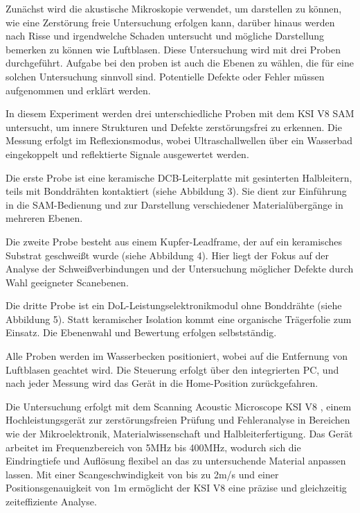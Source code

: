 Zunächst wird die akustische Mikroskopie verwendet, um darstellen zu können, wie eine Zerstörung freie Untersuchung erfolgen kann, darüber hinaus werden nach Risse und irgendwelche Schaden untersucht und mögliche Darstellung bemerken zu können wie Luftblasen. Diese Untersuchung wird mit drei Proben durchgeführt.
Aufgabe bei den proben ist auch die Ebenen zu wählen, die für eine solchen Untersuchung sinnvoll sind.  Potentielle
Defekte oder Fehler müssen aufgenommen und erklärt werden.


In diesem Experiment werden drei unterschiedliche Proben mit dem KSI V8 SAM untersucht, um innere Strukturen und Defekte zerstörungsfrei zu erkennen. Die Messung erfolgt im Reflexionsmodus, wobei Ultraschallwellen über ein Wasserbad eingekoppelt und reflektierte Signale ausgewertet werden.

Die erste Probe ist eine keramische DCB-Leiterplatte mit gesinterten Halbleitern, teils mit Bonddrähten kontaktiert (siehe Abbildung 3). Sie dient zur Einführung in die SAM-Bedienung und zur Darstellung verschiedener Materialübergänge in mehreren Ebenen.

Die zweite Probe besteht aus einem Kupfer-Leadframe, der auf ein keramisches Substrat geschweißt wurde (siehe Abbildung 4). Hier liegt der Fokus auf der Analyse der Schweißverbindungen und der Untersuchung möglicher Defekte durch Wahl geeigneter Scanebenen.

Die dritte Probe ist ein DoL-Leistungselektronikmodul ohne Bonddrähte (siehe Abbildung 5). Statt keramischer Isolation kommt eine organische Trägerfolie zum Einsatz. Die Ebenenwahl und Bewertung erfolgen selbstständig.

Alle Proben werden im Wasserbecken positioniert, wobei auf die Entfernung von Luftblasen geachtet wird. Die Steuerung erfolgt über den integrierten PC, und nach jeder Messung wird das Gerät in die Home-Position zurückgefahren.



Die Untersuchung erfolgt mit dem Scanning Acoustic Microscope KSI V8 \cite{2}, einem Hochleistungsgerät zur zerstörungsfreien Prüfung und Fehleranalyse in Bereichen wie der Mikroelektronik, Materialwissenschaft und Halbleiterfertigung. Das Gerät arbeitet im Frequenzbereich von 5MHz bis 400MHz, wodurch sich die Eindringtiefe und Auflösung flexibel an das zu untersuchende Material anpassen lassen. Mit einer Scangeschwindigkeit von bis zu 2m/s und einer Positionsgenauigkeit von 1m ermöglicht der KSI V8 eine präzise und gleichzeitig zeiteffiziente Analyse.

